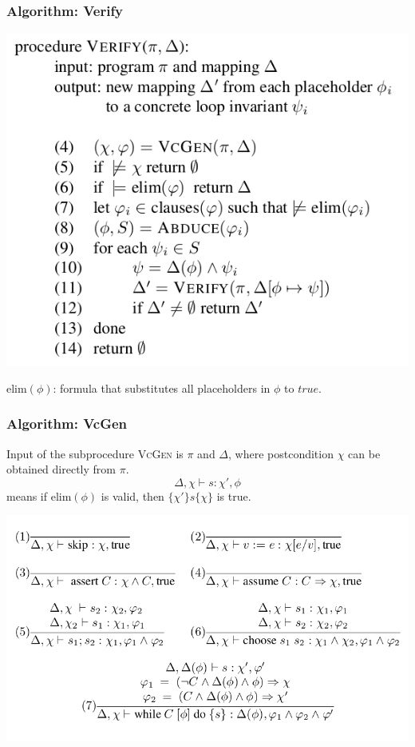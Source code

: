 \documentclass[11pt]{beamer}
\begin{document}
\begin{frame}\frametitle{Algorithm: Verify}

\begin{center}
\includegraphics[scale=0.35]{verify.png}
\end{center}
elim$(\phi)$: formula that substitutes all placeholders in $\phi$ to $true$.

\end{frame}

\begin{frame}\frametitle{Algorithm: VcGen}
Input of the subprocedure \textsc{VcGen} is $\pi$ and $\Delta$, where postcondition $\chi$ can be obtained directly from $\pi$.
\[\Delta, \chi \vdash s : \chi', \phi\]
means if $\text{elim}(\phi)$ is valid, then $\{\chi'\} s \{\chi\}$ is true.
\begin{center}
\includegraphics[scale=0.4]{inf.png}
\end{center}
\end{frame}
\end{document}

